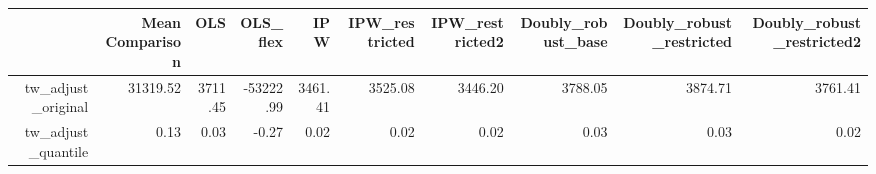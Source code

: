 \begin{table}[ht]
\centering
\begin{tabular}{rrrrrrrrrr}
  \hline
 & Mean Comparison & OLS & OLS\_flex & IPW & IPW\_restricted & IPW\_restricted2 & Doubly\_robust\_base & Doubly\_robust\_restricted & Doubly\_robust\_restricted2 \\ 
  \hline
tw\_adjust\_original & 31319.52 & 3711.45 & -53222.99 & 3461.41 & 3525.08 & 3446.20 & 3788.05 & 3874.71 & 3761.41 \\ 
  tw\_adjust\_quantile & 0.13 & 0.03 & -0.27 & 0.02 & 0.02 & 0.02 & 0.03 & 0.03 & 0.02 \\ 
   \hline
\end{tabular}
\end{table}
